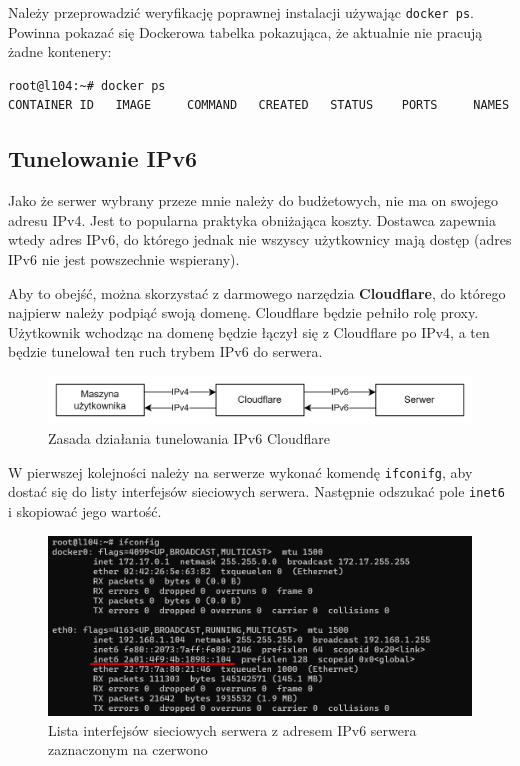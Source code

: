 \documentclass{article}
\begin{document}
Należy przeprowadzić weryfikację poprawnej instalacji używając \lstinline|docker ps|. Powinna pokazać się Dockerowa tabelka pokazująca, że aktualnie nie pracują żadne kontenery:

\begin{lstlisting}[caption=Wynik wykonania komendy weryfikującej instalację Dockera]
root@l104:~# docker ps
CONTAINER ID   IMAGE     COMMAND   CREATED   STATUS    PORTS     NAMES
\end{lstlisting}


\subsection{Tunelowanie IPv6}

Jako że serwer wybrany przeze mnie należy do budżetowych, nie ma on swojego adresu IPv4. Jest to popularna praktyka obniżająca koszty. Dostawca zapewnia wtedy adres IPv6, do którego jednak nie wszyscy użytkownicy mają dostęp (adres IPv6 nie jest powszechnie wspierany).

Aby to obejść, można skorzystać z darmowego narzędzia \textbf{Cloudflare}, do którego najpierw należy podpiąć swoją domenę. Cloudflare będzie pełniło rolę proxy. Użytkownik wchodząc na domenę będzie łączył się z Cloudflare po IPv4, a ten będzie tunelował ten ruch trybem IPv6 do serwera.

\begin{figure}[H]
    \centering
    \includegraphics[width=1\linewidth]{ipv6diagram.png}
    \caption{Zasada działania tunelowania IPv6 Cloudflare}
    \label{fig:enter-label}
\end{figure}

W pierwszej kolejności należy na serwerze wykonać komendę \lstinline|ifconifg|, aby dostać się do listy interfejsów sieciowych serwera. Następnie odszukać pole \lstinline|inet6| i skopiować jego wartość.

\begin{figure}[H]
    \centering
    \includegraphics[width=1\linewidth]{ipv6server.png}
    \caption{Lista interfejsów sieciowych serwera z adresem IPv6 serwera zaznaczonym na czerwono}
    \label{fig:enter-label}
\end{figure}
\end{document}
